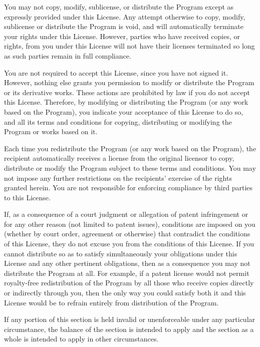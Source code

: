 \documentclass[%
	11pt,
        a4paper,
        twoside]{workrep}
\begin{document}
\gnuitem %
You may not copy, modify, sublicense, or distribute the Program
except as expressly provided under this License.  Any attempt
otherwise to copy, modify, sublicense or distribute the Program is
void, and will automatically terminate your rights under this License.
However, parties who have received copies, or rights, from you under
this License will not have their licenses terminated so long as such
parties remain in full compliance.

\gnuitem %
You are not required to accept this License, since you have not
signed it.  However, nothing else grants you permission to modify or
distribute the Program or its derivative works.  These actions are
prohibited by law if you do not accept this License.  Therefore, by
modifying or distributing the Program (or any work based on the
Program), you indicate your acceptance of this License to do so, and
all its terms and conditions for copying, distributing or modifying
the Program or works based on it.

\gnuitem %
Each time you redistribute the Program (or any work based on the
Program), the recipient automatically receives a license from the
original licensor to copy, distribute or modify the Program subject to
these terms and conditions.  You may not impose any further
restrictions on the recipients' exercise of the rights granted herein.
You are not responsible for enforcing compliance by third parties to
this License.

\gnuitem %
If, as a consequence of a court judgment or allegation of patent
infringement or for any other reason (not limited to patent issues),
conditions are imposed on you (whether by court order, agreement or
otherwise) that contradict the conditions of this License, they do not
excuse you from the conditions of this License.  If you cannot
distribute so as to satisfy simultaneously your obligations under this
License and any other pertinent obligations, then as a consequence you
may not distribute the Program at all.  For example, if a patent
license would not permit royalty-free redistribution of the Program by
all those who receive copies directly or indirectly through you, then
the only way you could satisfy both it and this License would be to
refrain entirely from distribution of the Program.

If any portion of this section is held invalid or unenforceable under
any particular circumstance, the balance of the section is intended to
apply and the section as a whole is intended to apply in other
circumstances.
\end{document}
